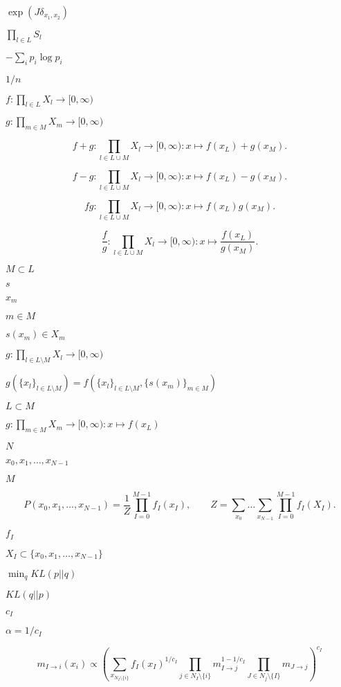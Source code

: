 \documentclass{article}
\begin{document}
$ \exp( J \delta_{x_1, x_2} ) $
\pagebreak

$\prod_{l\in L} S_l$
\pagebreak

$-\sum_i p_i \log p_i$
\pagebreak

$1/n$
\pagebreak

$f : \prod_{l\in L} X_l \to [0,\infty)$
\pagebreak

$g : \prod_{m\in M} X_m \to [0,\infty)$
\pagebreak

\[f+g : \prod_{l\in L\cup M} X_l \to [0,\infty) : x \mapsto f(x_L) + g(x_M).\]
\pagebreak

\[f-g : \prod_{l\in L\cup M} X_l \to [0,\infty) : x \mapsto f(x_L) - g(x_M).\]
\pagebreak

\[fg : \prod_{l\in L\cup M} X_l \to [0,\infty) : x \mapsto f(x_L) g(x_M).\]
\pagebreak

\[\frac{f}{g} : \prod_{l\in L\cup M} X_l \to [0,\infty) : x \mapsto \frac{f(x_L)}{g(x_M)}.\]
\pagebreak

$M \subset L$
\pagebreak

$s$
\pagebreak

$x_m$
\pagebreak

$m\in M$
\pagebreak

$s(x_m) \in X_m$
\pagebreak

$g : \prod_{l \in L \setminus M} X_l \to [0,\infty)$
\pagebreak

$g(\{x_l\}_{l\in L \setminus M}) = f(\{x_l\}_{l\in L \setminus M}, \{s(x_m)\}_{m\in M})$
\pagebreak

$L \subset M$
\pagebreak

$g : \prod_{m\in M} X_m \to [0,\infty) : x \mapsto f(x_L)$
\pagebreak

$N$
\pagebreak

$x_0,x_1,\dots,x_{N-1}$
\pagebreak

$M$
\pagebreak

\[
  P(x_0,x_1,\dots,x_{N-1}) = \frac{1}{Z} \prod_{I=0}^{M-1} f_I(x_I), \qquad
  Z = \sum_{x_0}\dots\sum_{x_{N-1}} \prod_{I=0}^{M-1} f_I(X_I).
\]
\pagebreak

$f_I$
\pagebreak

$X_I \subset \{x_0,x_1,\dots,x_{N-1}\}$
\pagebreak

$\min_q KL(p||q)$
\pagebreak

$ KL(q||p) $
\pagebreak

$ c_I $
\pagebreak

$ \alpha=1/c_I $
\pagebreak

\[ m_{I\to i}(x_i) \propto \left( \sum_{x_{N_I\setminus\{i\}}} f_I(x_I)^{1/c_I} \prod_{j\in N_I\setminus\{i\}} m_{I\to j}^{1-1/c_I} \prod_{J\in N_j\setminus\{I\}} m_{J\to j} \right)^{c_I} \]
\pagebreak
\end{document}
